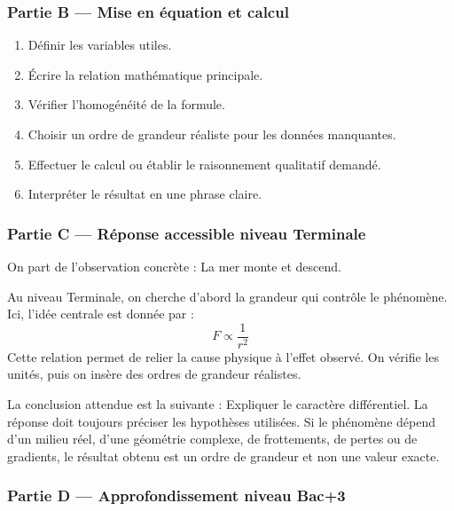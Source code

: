 \documentclass[11pt,a4paper]{article}
\begin{document}
\subsubsection*{Partie B — Mise en équation et calcul}

\begin{enumerate}
  \item Définir les variables utiles.
  \item Écrire la relation mathématique principale.
  \item Vérifier l'homogénéité de la formule.
  \item Choisir un ordre de grandeur réaliste pour les données manquantes.
  \item Effectuer le calcul ou établir le raisonnement qualitatif demandé.
  \item Interpréter le résultat en une phrase claire.
\end{enumerate}

\subsubsection*{Partie C — Réponse accessible niveau Terminale}

\begin{corrigebox}
On part de l'observation concrète : La mer monte et descend.

Au niveau Terminale, on cherche d'abord la grandeur qui contrôle le phénomène. Ici, l'idée centrale est donnée par :
\[
F\propto\frac1{r^2}
\]
Cette relation permet de relier la cause physique à l'effet observé. On vérifie les unités, puis on insère des ordres de grandeur réalistes.

La conclusion attendue est la suivante : Expliquer le caractère différentiel. La réponse doit toujours préciser les hypothèses utilisées. Si le phénomène dépend d'un milieu réel, d'une géométrie complexe, de frottements, de pertes ou de gradients, le résultat obtenu est un ordre de grandeur et non une valeur exacte.
\end{corrigebox}

\subsubsection*{Partie D — Approfondissement niveau Bac+3}
\end{document}
